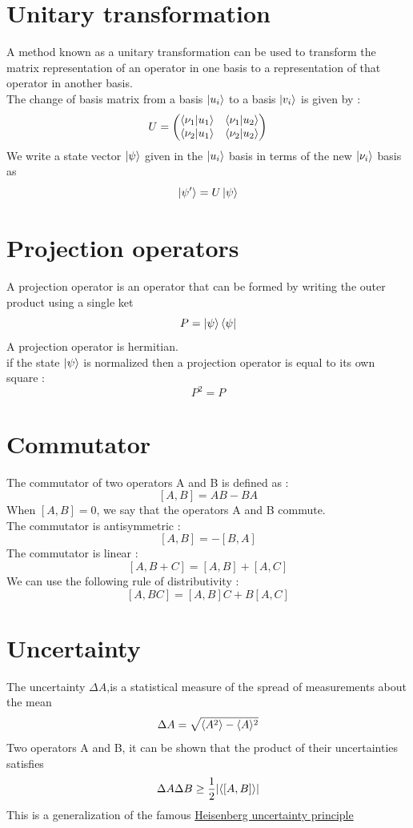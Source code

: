 \documentclass[12pt,oneside]{book}
\begin{document}
\section{Unitary transformation}
A method known as a unitary transformation can be used to transform the matrix representation of an operator in one basis to a representation of that operator in another basis.\\
The change of basis matrix from a basis $\ket{u_i}$ to a basis $\ket{v_i}$ is given by :
\[ U = \left( \begin{matrix}
            \braket{\nu_1|u_1} & \braket{\nu_1|u_2} \\
            \braket{\nu_2|u_1} & \braket{\nu_2|u_2}
        \end{matrix}\right) \]
We write a state vector $\ket{\psi}$ given in the $\ket{u_i}$ basis in terms of the new $\ket{\nu_i}$ basis as
\[ \ket{\psi'} = U\ket{\psi} \]
\section{Projection operators}
A projection operator is an operator that can be formed by writing the outer product using a single ket
\[P = \ket{\psi}\bra{\psi}\]
A projection operator is hermitian.\\
if the state $\ket{\psi}$ is normalized then a projection operator is equal to its own square :
\[P^2 = P\]
\section{Commutator}
The commutator of two operators A and B is defined as :
\[ [A,B] = AB - BA \]
When $ [A,B] = 0 $, we say that the operators A and B commute.\\
The commutator is antisymmetric :
\[ [A,B] = -[B,A] \]
The commutator is linear :
\[ [A,B+C] = [A,B] + [A,C] \]
We can use the following rule of distributivity :
\[ [A,BC] = [A,B]C + B[A,C] \]
\section{Uncertainty}
The uncertainty $\Delta A$,is a statistical measure of the spread of measurements about the mean
\[\Delta A = \sqrt{\langle A^2 \rangle - \langle A \rangle^2} \]
Two operators A and B, it can be shown that the product of their uncertainties satisfies
\[\Delta A\Delta B \geq \frac{1}{2} | \langle [A,B] \rangle | \]
This is a generalization of the famous \underline{Heisenberg uncertainty principle}
\end{document}
